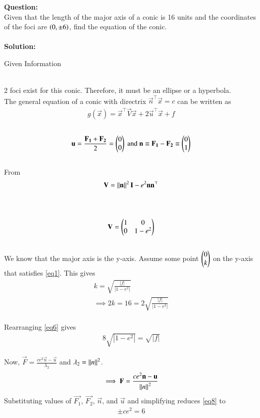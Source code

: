 \documentclass[journal]{IEEEtran}
\begin{document}
\textbf{Question:}\\
Given that the length of the major axis of a conic is 16 units and the coordinates of the foci are $\left(0,\pm6\right)$, find the equation of the conic.
\\ \\
\textbf{Solution:} \\
\begin{table}[h!]
  \centering
  
  \caption{Given Information}
  \label{Table 1}
\end{table} \\
2 foci exist for this conic. Therefore, it must be an ellipse or a hyperbola.
\\
The general equation of a conic with directrix $\vec{n}^\top\vec{x}=c$ can be written as 
\begin{align}
g(\vec{x}) = \vec{x}^\top\vec{V}\vec{x}+2\vec{u}^\top\vec{x}+f \label{eq1}
\end{align}
\\
\begin{align}
\mathbf{u} =\frac{\mathbf{F_1}+\mathbf{F_2}}{2}=\begin{pmatrix}0\\0\end{pmatrix} \text{ and } \mathbf{n}\equiv\mathbf{F_1}-\mathbf{F_2}\equiv\begin{pmatrix}0\\1\end{pmatrix} \label{eq2}
\end{align}
\\
From
\begin{align}
\mathbf{V} = \left\lVert\mathbf{n}\right\rVert^2\mathbf{I} - e^2\mathbf{n}\mathbf{n}^{\top}
\end{align}
\\
\\
\begin{align}
\mathbf{V} = \begin{pmatrix}1&0\\0&1-e^2\end{pmatrix}
\end{align}
\\
We know that the major axis is the y-axis. Assume some point $\begin{pmatrix}0\\k\end{pmatrix}$ on the y-axis that satisfies \ref{eq1}. This gives
\begin{align}
k = \sqrt{\frac{|f|}{|1-e^2|}}
\\
\implies 2k = 16 = 2\sqrt{\frac{|f|}{|1-e^2|}} \label{eq6}
\end{align}
\\
Rearranging \ref{eq6} gives 
\begin{align}
8\sqrt{|1-e^2|}=\sqrt{|f|} \label{eq7}
\end{align}

Now, $\vec{F}=\frac{ce^2\vec{n}-\vec{u}}{\lambda_2}$ and $\lambda_2=\left\lVert n\right\rVert^2$.
\\
\begin{align}
\implies\mathbf{F}=\frac{ce^2\mathbf{n}-\mathbf{u}}{\left\lVert n\right\rVert^2} \label{eq8}
\end{align}
Substituting values of $\vec{F_1}$, $\vec{F_2}$, $\vec{n}$, and $\vec{u}$ and simplifying reduces \ref{eq8} to
\begin{align}
\pm ce^2=6 \label{eq9}
\end{align}
\end{document}
